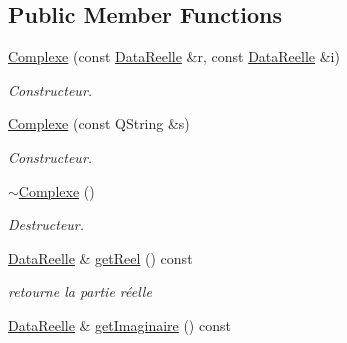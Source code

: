 \subsection*{Public Member Functions}
\begin{DoxyCompactItemize}
\item 
\hyperlink{classNombre_1_1Complexe_a752a5842b99a8e39bb89f4276d43e83c}{Complexe} (const \hyperlink{classNombre_1_1DataReelle}{DataReelle} \&r, const \hyperlink{classNombre_1_1DataReelle}{DataReelle} \&i)
\begin{DoxyCompactList}\small\item\em Constructeur. \item\end{DoxyCompactList}\item 
\hyperlink{classNombre_1_1Complexe_ac99372bf8b18c413b5c291b74eb846a4}{Complexe} (const QString \&s)
\begin{DoxyCompactList}\small\item\em Constructeur. \item\end{DoxyCompactList}\item 
\hyperlink{classNombre_1_1Complexe_abb864b5ffce7a6cc57c34ca06f331a60}{$\sim$Complexe} ()
\begin{DoxyCompactList}\small\item\em Destructeur. \item\end{DoxyCompactList}\item 
\hypertarget{classNombre_1_1Complexe_a7c8a9640dff617d6db1217604ebc6733}{
\hyperlink{classNombre_1_1DataReelle}{DataReelle} \& \hyperlink{classNombre_1_1Complexe_a7c8a9640dff617d6db1217604ebc6733}{getReel} () const }
\label{classNombre_1_1Complexe_a7c8a9640dff617d6db1217604ebc6733}

\begin{DoxyCompactList}\small\item\em retourne la partie réelle \item\end{DoxyCompactList}\item 
\hypertarget{classNombre_1_1Complexe_abda66d8237e6feb2f03178e59b6988a5}{
\hyperlink{classNombre_1_1DataReelle}{DataReelle} \& \hyperlink{classNombre_1_1Complexe_abda66d8237e6feb2f03178e59b6988a5}{getImaginaire} () const }
\label{classNombre_1_1Complexe_abda66d8237e6feb2f03178e59b6988a5}


\end{DoxyCompactItemize}
